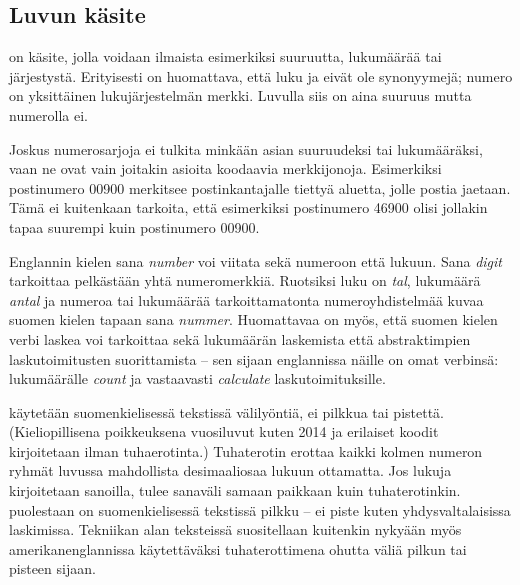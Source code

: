 \subsection*{Luvun käsite}

 on käsite, jolla voidaan ilmaista esimerkiksi suuruutta, lukumäärää tai järjestystä. Erityisesti on huomattava, että luku ja  eivät ole synonyymejä; numero on yksittäinen lukujärjestelmän merkki. Luvulla siis on aina suuruus mutta numerolla ei.

\begin{esimerkki}
\end{esimerkki}

Joskus numerosarjoja ei tulkita minkään asian suuruudeksi tai lukumääräksi, vaan ne ovat vain joitakin asioita koodaavia merkkijonoja. Esimerkiksi postinumero 00900 merkitsee postinkantajalle tiettyä aluetta, jolle postia jaetaan. Tämä ei kuitenkaan tarkoita, että esimerkiksi postinumero 46900 olisi jollakin tapaa suurempi kuin postinumero 00900.


Englannin kielen sana \textit{number} voi viitata sekä numeroon että lukuun. Sana \textit{digit} tarkoittaa pelkästään yhtä numeromerkkiä. Ruotsiksi luku on \textit{tal}, lukumäärä \textit{antal} ja numeroa tai lukumäärää tarkoittamatonta numeroyhdistelmää kuvaa suomen kielen tapaan sana \textit{nummer}. Huomattavaa on myös, että suomen kielen verbi laskea voi tarkoittaa sekä lukumäärän laskemista että abstraktimpien laskutoimitusten suorittamista -- sen sijaan englannissa näille on omat verbinsä: lukumäärälle \textit{count} ja vastaavasti \textit{calculate} laskutoimituksille.

 käytetään suomenkielisessä tekstissä välilyöntiä, ei pilkkua tai pistettä. (Kieliopillisena poikkeuksena vuosiluvut kuten 2014 ja erilaiset koodit kirjoitetaan ilman tuhaerotinta.) Tuhaterotin erottaa kaikki kolmen numeron ryhmät luvussa mahdollista desimaaliosaa lukuun ottamatta. Jos lukuja kirjoitetaan sanoilla, tulee sanaväli samaan paikkaan kuin tuhaterotinkin.  puolestaan on suomenkielisessä tekstissä pilkku -- ei piste kuten yhdysvaltalaisissa laskimissa. Tekniikan alan teksteissä suositellaan kuitenkin nykyään myös amerikanenglannissa käytettäväksi tuhaterottimena ohutta väliä pilkun tai pisteen sijaan. %

